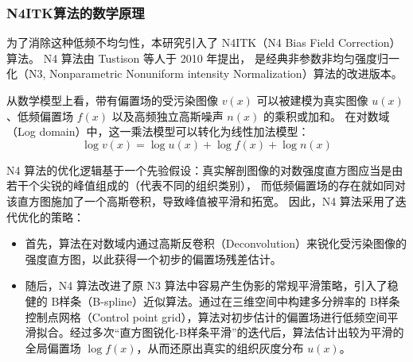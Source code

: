     \subsubsection{N4ITK算法的数学原理}
      为了消除这种低频不均匀性，本研究引入了 N4ITK（N4 Bias Field Correction）算法。
      N4 算法由 Tustison 等人于 2010 年提出，
      是经典非参数非均匀强度归一化（N3, Nonparametric Nonuniform intensity Normalization）算法的改进版本\cite{tustisonN4ITKImprovedN32010}。
      \par 从数学模型上看，带有偏置场的受污染图像 $v(x)$ 可以被建模为真实图像 $u(x)$、低频偏置场 $f(x)$ 以及高频独立高斯噪声 $n(x)$ 的乘积或加和。
      在对数域（Log domain）中，这一乘法模型可以转化为线性加法模型：
      \begin{equation}
        \log v(x) = \log u(x) + \log f(x) + \log n(x)
      \end{equation}
      \par N4 算法的优化逻辑基于一个先验假设：真实解剖图像的对数强度直方图应当是由若干个尖锐的峰值组成的（代表不同的组织类别），
      而低频偏置场的存在就如同对该直方图施加了一个高斯卷积，导致峰值被平滑和拓宽。
      因此，N4 算法采用了迭代优化的策略：
      \begin{itemize}
        \item 首先，算法在对数域内通过高斯反卷积（Deconvolution）来锐化受污染图像的强度直方图，以此获得一个初步的偏置场残差估计。
        \item 随后，N4 算法改进了原 N3 算法中容易产生伪影的常规平滑策略，引入了稳健的 B样条（B-spline）近似算法。通过在三维空间中构建多分辨率的 B样条控制点网格（Control point grid），算法对初步估计的偏置场进行低频空间平滑拟合。经过多次“直方图锐化-B样条平滑”的迭代后，算法估计出较为平滑的全局偏置场 $\log f(x)$，从而还原出真实的组织灰度分布 $u(x)$。
      \end{itemize}
